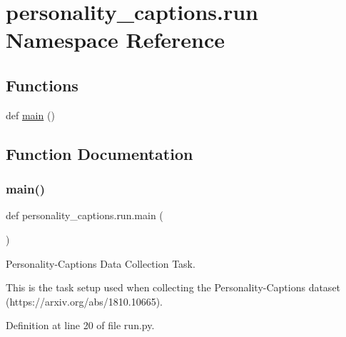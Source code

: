 \hypertarget{namespacepersonality__captions_1_1run}{}\section{personality\+\_\+captions.\+run Namespace Reference}
\label{namespacepersonality__captions_1_1run}
\subsection*{Functions}
\begin{DoxyCompactItemize}
\item 
def \hyperlink{namespacepersonality__captions_1_1run_a6cc04d2f2bf859221adef60a6ea0857f}{main} ()
\end{DoxyCompactItemize}


\subsection{Function Documentation}
\mbox{\label{namespacepersonality__captions_1_1run_a6cc04d2f2bf859221adef60a6ea0857f}} 
\subsubsection{\texorpdfstring{main()}{main()}}
{\footnotesize\ttfamily def personality\+\_\+captions.\+run.\+main (\begin{DoxyParamCaption}{ }\end{DoxyParamCaption})}

\begin{DoxyVerb}Personality-Captions Data Collection Task.

This is the task setup used when collecting the Personality-Captions dataset
(https://arxiv.org/abs/1810.10665).
\end{DoxyVerb}
 

Definition at line 20 of file run.\+py.


